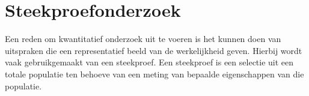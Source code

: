 \chapter{Steekproefonderzoek}
Een reden om kwantitatief onderzoek uit te voeren is het kunnen doen van uitspraken die een representatief beeld van de werkelijkheid geven. Hierbij wordt vaak gebruikgemaakt van een steekproef. Een steekproef is een selectie uit een totale populatie ten behoeve van een meting van bepaalde eigenschappen van die populatie.

\begin{figure}
\centering
\end{figure}
